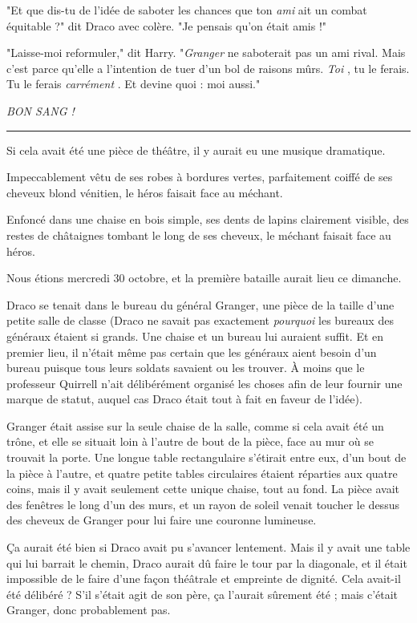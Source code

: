 "Et que dis-tu de l'idée de saboter les chances que ton \emph{ami}  ait un combat équitable ?" dit Draco avec colère. "Je pensais qu'on était amis !"

"Laisse-moi reformuler," dit Harry. "\emph{Granger}  ne saboterait pas un ami rival. Mais c'est parce qu'elle a l'intention de tuer d'un bol de raisons mûrs. \emph{Toi} , tu le ferais. Tu le ferais \emph{carrément} . Et devine quoi : moi aussi."

\emph{BON SANG !} 
\par\noindent\rule{\textwidth}{0.4pt}
Si cela avait été une pièce de théâtre, il y aurait eu une musique dramatique.

Impeccablement vêtu de ses robes à bordures vertes, parfaitement coiffé de ses cheveux blond vénitien, le héros faisait face au méchant.

Enfoncé dans une chaise en bois simple, ses dents de lapins clairement visible, des restes de châtaignes tombant le long de ses cheveux, le méchant faisait face au héros.

Nous étions mercredi 30 octobre, et la première bataille aurait lieu ce dimanche.

Draco se tenait dans le bureau du général Granger, une pièce de la taille d'une petite salle de classe (Draco ne savait pas exactement \emph{pourquoi}  les bureaux des généraux étaient si grands. Une chaise et un bureau lui auraient suffit. Et en premier lieu, il n'était même pas certain que les généraux aient besoin d'un bureau puisque tous leurs soldats savaient ou les trouver. À moins que le professeur Quirrell n'ait délibérément organisé les choses afin de leur fournir une marque de statut, auquel cas Draco était tout à fait en faveur de l'idée).

Granger était assise sur la seule chaise de la salle, comme si cela avait été un trône, et elle se situait loin à l'autre de bout de la pièce, face au mur où se trouvait la porte. Une longue table rectangulaire s'étirait entre eux, d'un bout de la pièce à l'autre, et quatre petite tables circulaires étaient réparties aux quatre coins, mais il y avait seulement cette unique chaise, tout au fond. La pièce avait des fenêtres le long d'un des murs, et un rayon de soleil venait toucher le dessus des cheveux de Granger pour lui faire une couronne lumineuse.

Ça aurait été bien si Draco avait pu s'avancer lentement. Mais il y avait une table qui lui barrait le chemin, Draco aurait dû faire le tour par la diagonale, et il était impossible de le faire d'une façon théâtrale et empreinte de dignité. Cela avait-il été délibéré ? S'il s'était agit de son père, ça l'aurait sûrement été ; mais c'était Granger, donc probablement pas.

